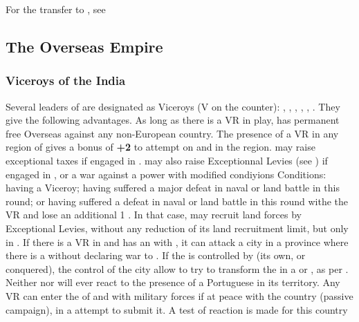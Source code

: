 \aparag For the transfer to , see

\subsection{The Overseas Empire}
\subsubsection{Viceroys of the India}\label{chSpecific:Portugal:Viceroys}
\aparag Several leaders of \POR are designated as Viceroys (V on the
counter): , , ,
, , \leaderNoronha. They give \POR
the following advantages.
\bparag As long as there is a VR in play, \POR has permanent free
Overseas \CB against any non-European country.
\bparag The presence of a VR in any region of \ROTW gives a bonus of
{\bf +2} to \CONC attempt on \TP and \COL in the region.
\aparag \POR may raise exceptional taxes if engaged in .
\aparag \POR may also raise Exceptionnal Levies (see
) if engaged in ,
or a war against a \ROTW power with modified condiyions
\bparag Conditions: having a Viceroy; having suffered a major defeat in
naval or land battle in \ROTW this round; or having suffered a defeat in
naval or land battle in \ROTW this round withe the VR and lose an
additional 1 \STAB.
\bparag In that case, \POR may recruit land forces by Exceptional
Levies, without any reduction of its land recruitment limit, but only in
\ROTW.
\label{chSpecific:Portugal:Goa Colony}
\bparag If there is a VR in  and \POR has an \dipAT
with , it can attack a city in a province where there
is a \TP without declaring war to .
\bparag If the \TP is controlled by \POR (its own, or conquered), the
control of the city allow \POR to try to transform the \TP in a \COL or
\POR, as per .
\bparag Neither  nor  will ever react to
the presence of a Portuguese \COL in its territory.
\bparag Any VR can enter the \COL of  and  with
military forces if at peace with the country (passive campaign), in a
attempt to submit it. A test of reaction is made for this country
